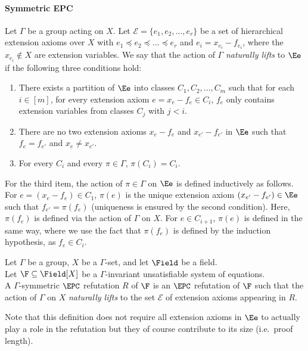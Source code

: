 \documentclass[a4paper,UKenglish,cleveref, autoref, thm-restate]{lipics-v2021}
\begin{document}
\paragraph*{Symmetric EPC}
Let $\Gamma$ be a group acting on $X$.
Let $\mathcal E = \{e_1,e_2,...,e_r\}$ be a set of hierarchical extension axioms over $X$ with
$e_1\preceq e_2\preceq ... \preceq e_r$
and $e_i = x_{e_i} - f_{e_i}$, where the $x_{e_i} \notin X$ are extension variables. 
We say that the action of $\Gamma$ \emph{naturally lifts} to $\Ee$ if the following three conditions hold: 
\begin{enumerate}
	\item There exists a partition of $\Ee$ into classes $C_1,C_2,...,C_m$ such that for each $i \in [m]$, for every extension axiom $e = x_e - f_e \in C_i$, $f_e$ only contains extension variables from classes $C_j$ with $j < i$.
	\item There are no two extension axioms $x_{e} - f_e$ and $x_{e'} - f_{e'}$ in $\Ee$ such that $f_e = f_{e'}$ and $x_e \neq x_{e'}$.
	\item For every $C_i$ and every $\pi \in \Gamma$, $\pi(C_i) = C_i$.
\end{enumerate}
For the third item, the action of $\pi \in \Gamma$ on $\Ee$ is defined inductively as follows. For $e = (x_e - f_e) \in C_1$, $\pi(e)$ is the unique extension axiom $(x_{e'} - f_{e'}) \in \Ee$ such that $f_{e'} = \pi(f_e)$ (uniqueness is ensured by the second condition). Here, $\pi(f_e)$ is defined via the action of $\Gamma$ on $X$. For $e \in C_{i+1}$, $\pi(e)$ is defined in the same way, where we use the fact that $\pi(f_e)$ is defined by the induction hypothesis, as $f_e \in C_i$.

\begin{definition}
	\label{def:symEPC}
	Let $\Gamma$ be a group, $X$ be a $\Gamma$-set, and let $\Field$ be a field. \\
	Let $\F \subseteq \Field[X]$ be a $\Gamma$-invariant unsatisfiable system of equations.\\
	A $\Gamma$-symmetric $\EPC$ refutation $R$ of $\F$ is an $\EPC$ refutation of $\F$ such that the action of $\Gamma$ on $X$ \emph{naturally lifts} to the set $\mathcal E$ of extension axioms appearing in $R$.
\end{definition}
Note that this definition does not require all extension axioms in $\Ee$ to actually play a role in the refutation but they of course contribute to its size (i.e.\ proof length).
\end{document}
